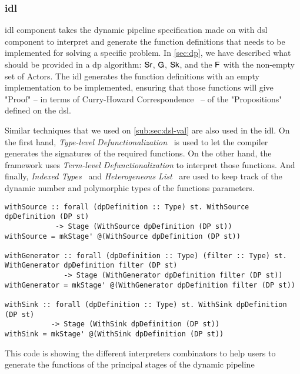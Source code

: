 \subsubsection{\texorpdfstring{\acrfull{idl}}{Lg}}
\acrshort{idl} component takes the dynamic pipeline specification made on with \acrshort{dsl} component to interpret and generate the function definitions
that needs to be implemented for solving a specific problem. In \autoref{sec:dp}, we have described what should be provided in a \acrshort{dp} algorithm: $\mathsf{Sr}$, $\mathsf{G}$, $\mathsf{Sk}$, and the $\mathsf{F}$ with the non-empty set of Actors.
The \acrshort{idl} generates the function definitions with an empty implementation to be implemented, ensuring that those functions will give "Proof" -- in terms of Curry-Howard Correspondence~\cite{curryhoward} --  of the "Propositions" defined on the \acrshort{dsl}.

Similar techniques that we used on \autoref{sub:sec:dsl-val} are also used in the \acrshort{idl}. 
On the first hand, \emph{Type-level Defunctionalization}~\cite{defunctionalization, fun-type-function-haskell} is used to let the compiler generates the signatures of the required functions. 
On the other hand, the framework uses \emph{Term-level Defunctionalization} to interpret those functions.
And finally, \emph{Indexed Types}~\cite{type-index} and \emph{Heterogeneous List}~\cite{hlist} are used to keep track of the dynamic number and polymorphic types of the functions parameters. 

\begin{listing}[H]
  \begin{verbatim}
withSource :: forall (dpDefinition :: Type) st. WithSource dpDefinition (DP st) 
            -> Stage (WithSource dpDefinition (DP st))
withSource = mkStage' @(WithSource dpDefinition (DP st))

withGenerator :: forall (dpDefinition :: Type) (filter :: Type) st. WithGenerator dpDefinition filter (DP st) 
              -> Stage (WithGenerator dpDefinition filter (DP st))
withGenerator = mkStage' @(WithGenerator dpDefinition filter (DP st))

withSink :: forall (dpDefinition :: Type) st. WithSink dpDefinition (DP st) 
           -> Stage (WithSink dpDefinition (DP st))
withSink = mkStage' @(WithSink dpDefinition (DP st))
  \end{verbatim}
  \caption[{[\texttt{Stage.hs}] Using with Interpreters of \acrshort{dp} encoded in $G_{dsl}$}]{This code is showing the different interpreters combinators to help users to generate the functions of the principal stages of the dynamic pipeline}
  \label{src:dpfh:6}
\end{listing}

